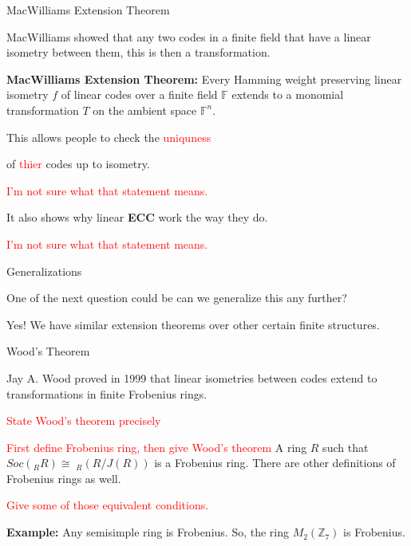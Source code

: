\documentclass{beamer}
\begin{document}
\begin{frame}{MacWilliams Extension Theorem}

    MacWilliams showed that any two codes in a finite field that have a linear isometry between them,
    this is then a transformation.

    \bigskip
    
    \textbf{MacWilliams Extension Theorem:} Every Hamming weight preserving linear isometry $f$ of
    linear codes over a finite field $\mathbb{F}$ extends to a monomial transformation $T$ on the
    ambient space $\mathbb{F}^n$.

\end{frame}

\begin{frame}
    
    This allows people to check the  
    \textcolor{red}{uniquness }
    
of  \textcolor{red}{thier}   codes up to isometry.

\textcolor{red}{I'm not sure what that statement means.}

    \medskip

    It also shows why linear \textbf{ECC} work the way they do.
    
    \textcolor{red}{I'm not sure what that statement means.}

\end{frame}

\begin{frame}{Generalizations}
    
    One of the next question could be can we generalize this any further?

    \bigskip

    \pause

    Yes! We have similar extension theorems over other certain finite structures.

\end{frame}

\begin{frame}{Wood's Theorem}
    
    Jay A. Wood proved in 1999 that linear isometries between codes extend to transformations in
    finite Frobenius rings.
    
    \textcolor{red}{State Wood's theorem precisely}

    \bigskip

  \textcolor{red}{First define Frobenius ring, then give Wood's theorem}  A ring $R$ such that $Soc(_RR)\cong\;_R(R/J(R))$ is a Frobenius ring. There are other definitions
    of Frobenius rings as well.

\textcolor{red}{Give some of those equivalent conditions.}
    \bigskip

    \pause

    \textbf{Example:} Any semisimple ring is Frobenius. So, the ring $M_2(\mathbb{Z}_7)$ is Frobenius.

\end{frame}
\end{document}
